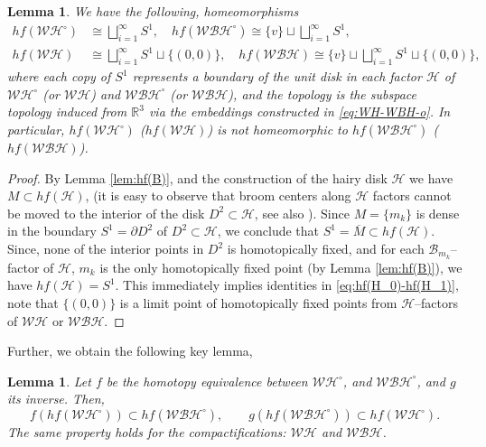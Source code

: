 \documentclass[reqno,12pt]{amsart}
\newtheorem{lemma}[theorem]{Lemma}
\theoremstyle{ourremark}
\numberwithin{equation}{section}
\numberwithin{theorem}{section}
\begin{document}
\begin{lemma}\label{lem:hf(WH)-hf(WBH)}
 We have the following, homeomorphisms 
\begin{equation}\label{eq:hf(H_0)-hf(H_1)}
\begin{split}
   hf(\mathcal{WH}^\circ) & \cong \bigsqcup^\infty_{i=1} S^1,\quad
   hf(\mathcal{WBH}^\circ) \cong \{v\}\sqcup \bigsqcup^\infty_{i=1} S^1,\\
   hf(\mathcal{WH}) & \cong \bigsqcup^\infty_{i=1} S^1 \sqcup \{(0,0)\},\quad
   hf(\mathcal{WBH}) \cong \{v\}\sqcup \bigsqcup^\infty_{i=1} S^1 \sqcup \{(0,0)\},
   \end{split}
\end{equation}
where each copy of $S^1$ represents a boundary of the unit disk in each factor $\mathcal{H}$ of $\mathcal{WH}^\circ$ (or $\mathcal{WH}$) and $\mathcal{WBH}^\circ$ (or $\mathcal{WBH}$), and the topology is the subspace topology induced from ${\mathbb{R}}^3$ via the embeddings constructed in \eqref{eq:WH-WBH-o}. In particular, $hf(\mathcal{WH}^\circ)$ ($hf(\mathcal{WH})$) is not homeomorphic to $hf(\mathcal{WBH}^\circ)$ ($hf(\mathcal{WBH})$).
\end{lemma}
\begin{proof}
 By Lemma \ref{lem:hf(B)}, and the construction of the hairy disk $\mathcal{H}$ we have 
 $M\subset hf(\mathcal{H})$, (it is easy to observe that broom centers along $\mathcal{H}$ factors cannot be moved to the interior of the disk $D^2\subset\mathcal{H}$, see also \cite[$(v)$ on p. 288]{Karimov-Repovs-Rosicki-Zastrow05}). Since $M=\{m_k\}$ is dense in the boundary $S^1=\partial D^2$ of $D^2\subset\mathcal{H}$, we conclude that $S^1=\overline{M}\subset hf(\mathcal{H})$. Since, none of the interior points in $D^2$ is homotopically fixed, and for each $\mathcal{B}_{m_k}$--factor of $\mathcal{H}$, $m_k$ is the only homotopically fixed point (by Lemma  \ref{lem:hf(B)}), we have 
 $hf(\mathcal{H})=S^1$.  This immediately implies identities in \eqref{eq:hf(H_0)-hf(H_1)}, note that $\{(0,0)\}$ is a limit point  of  homotopically fixed points from $\mathcal{H}$--factors of 
$\mathcal{WH}$ or $\mathcal{WBH}$.
\end{proof}
{\noindent} Further, we obtain the following key lemma,
\begin{lemma}\label{lem:g-f-hf}
Let $f$ be the homotopy equivalence between $\mathcal{WH}^\circ$,  and $\mathcal{WBH}^\circ$, and $g$ its inverse. Then, 
\begin{equation}\label{eq:g-f-hf}
 f(hf(\mathcal{WH}^\circ))\subset hf(\mathcal{WBH}^\circ),\qquad g(hf(\mathcal{WBH}^\circ))\subset hf(\mathcal{WH}^\circ).
\end{equation}
The same property holds for the compactifications: $\mathcal{WH}$ and $\mathcal{WBH}$.
\end{lemma}
\end{document}
